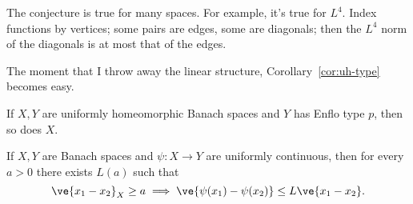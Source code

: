 The conjecture is true for many spaces. For example, it's true for $L^4$. Index functions by vertices; some pairs are edges, some are diagonals; then the $L^4$ norm of the diagonals is at most that of the edges.


The moment that I throw away the linear structure, Corollary~\ref{cor:uh-type} becomes easy.
\begin{pr}
If $X,Y$ are uniformly homeomorphic Banach spaces and $Y$ has Enflo type $p$, then so does $X$.
\end{pr}

\begin{lem}
If $X,Y$ are Banach spaces and $\psi:X\to Y$ are uniformly continuous, then for every $a>0$ there exists $L(a)$ such that 
\[
\ve{x_1-x_2}_X\ge a \implies \ve{\psi(x_1)-\psi(x_2)}\le L\ve{x_1-x_2}.
\]
\end{lem}

